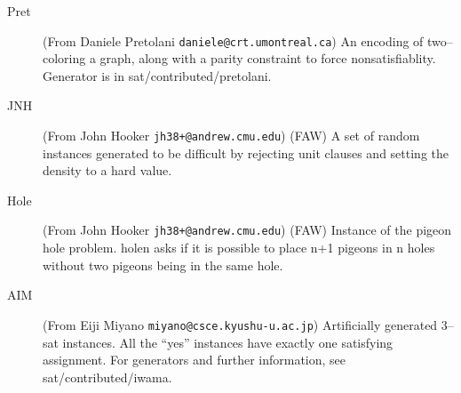 \begin{description}
\item[Pret] (From Daniele Pretolani {\tt daniele@crt.umontreal.ca}) An
encoding of two--coloring a graph, along with a parity constraint to
force nonsatisfiablity.  Generator is in sat/contributed/pretolani.

\item[JNH] (From John Hooker {\tt jh38+@andrew.cmu.edu}) (FAW) A set of
random instances generated to be difficult by rejecting unit clauses
and setting the density to a hard value.

\item[Hole] (From John Hooker {\tt jh38+@andrew.cmu.edu}) (FAW)
Instance of the pigeon hole problem.  holen asks if it is possible to
place n+1 pigeons in n holes without two pigeons being in the same
hole.

\item[AIM] (From Eiji Miyano {\tt miyano@csce.kyushu-u.ac.jp})
Artificially generated 3--sat instances.  All the ``yes'' instances
have exactly one satisfying assignment.  For generators and further
information, see sat/contributed/iwama.


\end{description}





